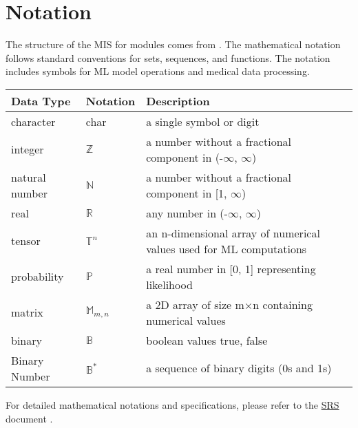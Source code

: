 \documentclass[12pt, titlepage]{article}
\begin{document}
\section{Notation}
The structure of the MIS for modules comes from \citet{HoffmanAndStrooper1995}. The mathematical notation follows standard conventions for sets, sequences, and functions. The notation includes symbols for ML model operations and medical data processing.
\begin{center}
    \renewcommand{\arraystretch}{1.2}
    \noindent 
    \begin{tabular}{l l p{7.5cm}} 
    \toprule 
    \textbf{Data Type} & \textbf{Notation} & \textbf{Description}\\ 
    \midrule
    character & char & a single symbol or digit\\
    integer & $\mathbb{Z}$ & a number without a fractional component in (-$\infty$, $\infty$)\\
    natural number & $\mathbb{N}$ & a number without a fractional component in [1, $\infty$)\\
    real & $\mathbb{R}$ & any number in (-$\infty$, $\infty$)\\
    tensor & $\mathbb{T}^{n}$ & an n-dimensional array of numerical values used for ML computations\\
    probability & $\mathbb{P}$ & a real number in [0, 1] representing likelihood\\
    matrix & $\mathbb{M}_{m,n}$ & a 2D array of size m×n containing numerical values\\
    binary & $\mathbb{B}$ & boolean values {true, false}\\
    Binary Number & $\mathbb{B}^*$ & a sequence of binary digits (0s and 1s)\\
    \bottomrule
    \end{tabular} 
    \end{center}
    For detailed mathematical notations and specifications, please refer to the \href{https://github.com/RezaJodeiri/CXR-Capstone/blob/main/docs/SRS/SRS.pdf}{SRS} document \citep{SRS}.
\end{document}

